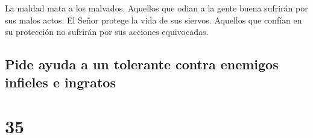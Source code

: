 La maldad mata a los malvados. Aquellos que odian a la
gente buena sufrirán por sus malos actos.  El Señor
protege la vida de sus siervos. Aquellos que confían en su protección no
sufrirán por sus acciones equivocadas.

\hypertarget{pide-ayuda-a-un-tolerante-contra-enemigos-infieles-e-ingratos}{%
\subsection{Pide ayuda a un tolerante contra enemigos infieles e
ingratos}\label{pide-ayuda-a-un-tolerante-contra-enemigos-infieles-e-ingratos}}

\hypertarget{section-34}{%
\section{35}\label{section-34}}

